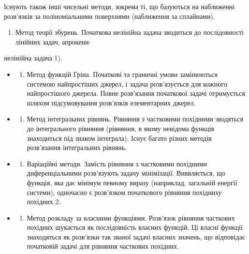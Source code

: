 \documentclass[
  ukrainian,
]{article}
\providecommand{\tightlist}{%
  \setlength{\itemsep}{0pt}\setlength{\parskip}{0pt}}
\begin{document}
Існують також інші чисельні методи, зокрема ті, що базуються на
наближенні розв'язків за поліноміальними поверхнями (наближення за
сплайнами).

\begin{enumerate}
\def\labelenumi{\arabic{enumi}.}
\setcounter{enumi}{5}
\tightlist
\item
  Метод теорії збурень. Початкова нелінійна задача зводиться до
  послідовності лінійних задач, апрокенн-
\end{enumerate}

нелінійна задача 1).

\begin{itemize}
\tightlist
\item
  \begin{enumerate}
  \def\labelenumi{\arabic{enumi}.}
  \setcounter{enumi}{6}
  \tightlist
  \item
    Метод функцій Гріна. Початкові та граничні умови замінюються
    системою найпростіших джерел, і задача розв'язується для кожного
    найпростішого джерела. Повне розв'язання початкової задачі
    отримується шляхом підсумовування розв'язків елементарних джерел.
  \end{enumerate}
\item
  \begin{enumerate}
  \def\labelenumi{\arabic{enumi}.}
  \setcounter{enumi}{7}
  \tightlist
  \item
    Метод інтегральних рівнянь. Рівняння з частковими похідними
    зводяться до інтегрального рівняння (рівняння, в якому невідома
    функція знаходиться під знаком інтеграла). Існує багато різних
    методів розв'язання інтегральних рівнянь.
  \end{enumerate}
\item
  \begin{enumerate}
  \def\labelenumi{\arabic{enumi}.}
  \setcounter{enumi}{8}
  \tightlist
  \item
    Варіаційні методи. Замість рівняння з частковими похідними
    диференціальними розв'язують задачу мінімізації. Виявляється, що
    функція, яка дає мінімум певному виразу (наприклад, загальній
    енергії системи), одночасно є розв'язком початкового рівняння
    похідниху похідних 2.
  \end{enumerate}
\item
  \begin{enumerate}
  \def\labelenumi{\arabic{enumi}.}
  \setcounter{enumi}{9}
  \tightlist
  \item
    Метод розкладу за власними функціями. Розв'язок рівняння часткових
    похідних шукається як послідовність власних функцій. Ці власні
    функції знаходяться як розв'язки так званої задачі власних значень,
    що відповідає початковій задачі для рівняння часткових похідних.
  \end{enumerate}
\end{itemize}
\end{document}
